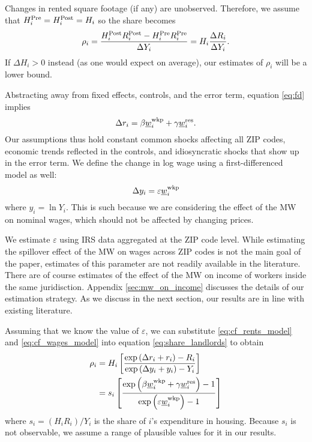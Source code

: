 Changes in rented square footage (if any) are unobserved.
Therefore, we assume that
$H^{\text{Pre}}_i = H^{\text{Post}}_i = H_i$ 
so the share becomes
\begin{equation}\label{eq:share_landlords}
    \rho_i = \frac{H^{\text{Post}}_i R^{\text{Post}}_i - H^{\text{Pre}}_i R^{\text{Pre}}_i}{\Delta Y_i} = 
                H_i \frac{\Delta R_i}{\Delta Y_i} .
\end{equation}
If $\Delta H_i > 0$ instead (as one would expect on average), 
our estimates of $\rho_i$ will be a lower bound.

Abstracting away from fixed effects, controls, and the error term, 
equation \eqref{eq:fd} implies
\begin{equation}\label{eq:cf_rents_model}
    \Delta r_i = \beta \underline{w}_i^{\text{wkp}} + \gamma \underline{w}_i^{\text{res}} .
\end{equation}
Our assumptions thus hold 
constant common shocks affecting all ZIP codes,
economic trends reflected in the controls, and
idiosyncratic shocks that show up in the error term.
We define the change in log wage using a first-differenced model as well:
\begin{equation}\label{eq:cf_wages_model}
    \Delta y_i = \varepsilon \underline{w}_i^{\text{wkp}}
\end{equation}
where $y_i=\ln Y_i$.
This is such because we are considering the effect of the MW on nominal wages,
which should not be affected by changing prices.

We estimate $\varepsilon$ using IRS data aggregated at the ZIP code level.
While estimating the spillover effect of the MW on wages across ZIP codes is 
not the main goal of the paper, 
estimates of this parameter are not readily available in the literature.
There are of course estimates of the effect of the MW on income of workers
inside the same juridisction.
Appendix \ref{sec:mw_on_income} discusses the details of our estimation 
strategy.
As we discuss in the next section, our results are in line with existing 
literature.

%
%
%

Assuming that we know the value of $\varepsilon$, we can substitute
\eqref{eq:cf_rents_model} and \eqref{eq:cf_wages_model} into equation
\eqref{eq:share_landlords} to obtain
\begin{equation}\label{eq:rho}
    \begin{split}
        \rho_i & = H_i \left[ 
        \frac{\exp \left(\Delta r_i + r_i \right) - R_i }
             {\exp \left(\Delta y_i + y_i \right) - Y_i }
        \right] \\
        & = s_i \left[
            \frac{\exp \left( \beta \underline{w}_i^{\text{wkp}} + \gamma \underline{w}_i^{\text{res}} \right) - 1 }
                {\exp \left( \varepsilon \underline{w}_i^{\text{wkp}} \right) - 1 }
            \right]
    \end{split}
\end{equation}
where $s_i = \left(H_i R_i\right)/Y_i$ is the share of $i$'s expenditure in 
housing.
Because $s_i$ is not observable, we assume a range of plausible values for it
in our results.

